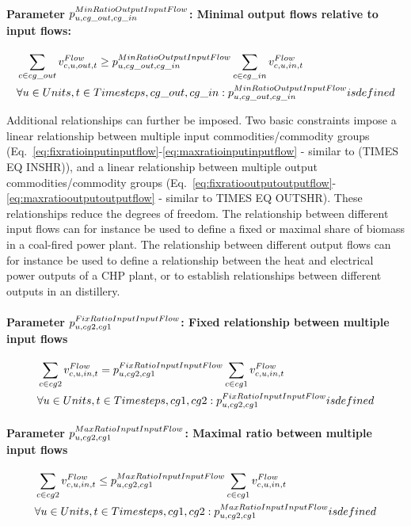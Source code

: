 \paragraph{Parameter $\pMinRatioOutputInputFlow$: Minimal output flows relative to input flows:}
\begin{align} \label{eq:minratiooutputinputflow}
&\sum_{\commodity \in cg\_out} \vFlow[\commodity,\unit,out,\timestep] \ge \pMinRatioOutputInputFlow \sum_{\commodity \in cg\_in} \vFlow[\commodity,\unit,in,\timestep] \nonumber \\
&\forall \units, \timesteps, cg\_out, cg\_in : \pMinRatioOutputInputFlow is defined
\end{align}

Additional relationships can further be imposed. Two basic constraints impose a linear relationship between multiple input commodities/commodity groups (Eq.~\eqref{eq:fixratioinputinputflow}-\eqref{eq:maxratioinputinputflow} - similar to (TIMES EQ INSHR)), and a linear relationship between multiple output commodities/commodity groups (Eq.~\eqref{eq:fixratiooutputoutputflow}-\eqref{eq:maxratiooutputoutputflow} - similar to TIMES EQ OUTSHR). These relationships reduce the degrees of freedom. The relationship between different input flows can for instance be used to define a fixed or maximal share of biomass in a coal-fired power plant. The relationship between different output flows can for instance be used to define a relationship between the heat and electrical power outputs of a CHP plant, or to establish relationships between different outputs in an distillery. 

\paragraph{Parameter $\pFixRatioInputInputFlow$: Fixed relationship between multiple input flows}
\begin{align} \label{eq:fixratioinputinputflow}
&\sum_{\commodity \in cg2} \vFlow[\commodity,\unit,in,\timestep] = \pFixRatioInputInputFlow \sum_{\commodity \in cg1} \vFlow[\commodity,\unit,in,\timestep] \nonumber \\
&\forall \units, \timesteps, cg1, cg2: \pFixRatioInputInputFlow is defined
\end{align}

\paragraph{Parameter $\pMaxRatioInputInputFlow$: Maximal ratio between multiple input flows}
\begin{align} \label{eq:maxratioinputinputflow}
&\sum_{\commodity \in cg2} \vFlow[\commodity,\unit,in,\timestep] \le \pMaxRatioInputInputFlow \sum_{\commodity \in cg1} \vFlow[\commodity,\unit,in,\timestep] \nonumber \\
&\forall \units, \timesteps, cg1, cg2: \pMaxRatioInputInputFlow is defined
\end{align}


